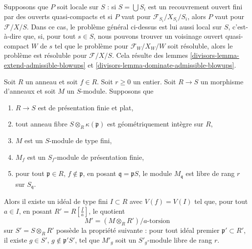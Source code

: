 \begin{remark}
\medskip\noindent
Supposons que $P$ soit locale sur $S$ : si $S = \bigcup S_i$ est un recouvrement ouvert
fini par des ouverts quasi-compacts et si $P$ vaut pour
$\mathcal{F}_{S_i}/X_{S_i}/S_i$, alors $P$ vaut pour $\mathcal{F}/X/S$.
Dans ce cas, le problème général ci-dessus est lui aussi local sur $S$, c'est-à-dire que,
si, pour tout $s \in S$, nous pouvons trouver un voisinage ouvert quasi-compact $W$ de $s$
tel que le problème pour $\mathcal{F}_W/X_W/W$ soit résoluble, alors le
problème est résoluble pour $\mathcal{F}/X/S$. Cela résulte des
lemmes \ref{divisors-lemma-extend-admissible-blowups} et
\ref{divisors-lemma-dominate-admissible-blowups}.
\end{remark}

\begin{lemma}
\label{lemma-helper-blowup-affine-space}
Soit $R$ un anneau et soit $f \in R$. Soit $r\geq 0$ un entier.
Soit $R \to S$ un morphisme d'anneaux et soit $M$ un $S$-module. Supposons que
\begin{enumerate}
\item $R \to S$ est de présentation finie et plat,
\item tout anneau fibre $S \otimes_R \kappa(\mathfrak p)$ est
géométriquement intègre sur $R$,
\item $M$ est un $S$-module de type fini,
\item $M_f$ est un $S_f$-module de présentation finie,
\item pour tout $\mathfrak p \in R$, $f \not \in \mathfrak p$, en posant
$\mathfrak q = \mathfrak pS$, le module $M_{\mathfrak q}$ est libre
de rang $r$ sur $S_\mathfrak q$.
\end{enumerate}
Alors il existe un idéal de type fini $I \subset R$ avec
$V(f) = V(I)$ tel que, pour tout $a \in I$, en posant $R' = R[\frac{I}{a}]$,
le quotient
$$
M' = (M \otimes_R R')/a\text{-torsion}
$$
sur $S' = S \otimes_R R'$ possède la propriété suivante : pour tout idéal premier
$\mathfrak p' \subset R'$, il existe $g \in S'$,
$g \not \in \mathfrak p'S'$, tel que $M'_g$ soit un $S'_g$-module libre
de rang $r$.
\end{lemma}


